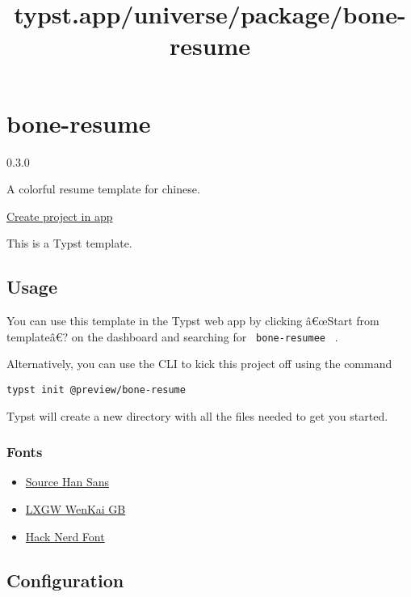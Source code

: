 \title{typst.app/universe/package/bone-resume}

\label{banner}
\label{template-thumbnail}

\section{bone-resume}\label{bone-resume}

{ 0.3.0 }

A colorful resume template for chinese.

\href{/app?template=bone-resume&version=0.3.0}{Create project in app}

\label{readme}
This is a Typst template.

\subsection{Usage}\label{usage}

You can use this template in the Typst web app by clicking â€œStart from
templateâ€? on the dashboard and searching for \texttt{\ bone-resumee\ }
.

Alternatively, you can use the CLI to kick this project off using the
command

\begin{verbatim}
typst init @preview/bone-resume
\end{verbatim}

Typst will create a new directory with all the files needed to get you
started.

\subsubsection{Fonts}\label{fonts}

\begin{itemize}
\tightlist
\item
  \href{https://github.com/adobe-fonts/source-han-sans}{Source Han Sans}
\item
  \href{https://github.com/lxgw/LxgwWenkaiGB}{LXGW WenKai GB}
\item
  \href{https://www.nerdfonts.com/}{Hack Nerd Font}
\end{itemize}

\subsection{Configuration}\label{configuration}

